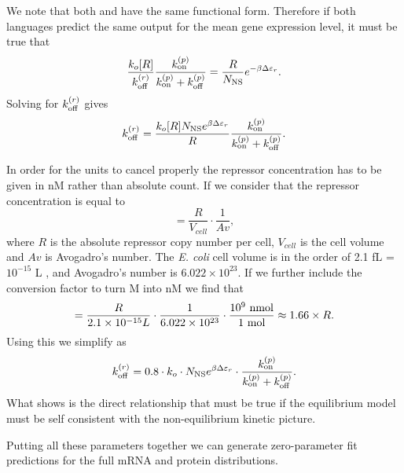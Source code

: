 We note that both  and  have the same
functional form. Therefore if both languages predict the same output for the
mean gene expression level, it must be true that
\begin{equation}
  {k_o [R] \over k^{(r)}_{\text{off}}}{k^{(p)}_{\text{on}}\over k^{(p)}_{\text{on}}+ k^{(p)}_{\text{off}}} =
  {R \over N_\text{NS}} e^{-\beta\Delta\varepsilon_r}.
\end{equation}
Solving for $k^{(r)}_{\text{off}}$ gives
\begin{equation}
  k^{(r)}_{\text{off}} = {k_o [R] N_\text{NS} e^{\beta\Delta\varepsilon_r} \over R}{k^{(p)}_{\text{on}} \over k^{(p)}_{\text{on}} + k^{(p)}_{\text{off}}}.
  \label{eq_kroff_complete}
\end{equation}

In order for the units to cancel properly the repressor concentration has to be
given in nM rather than absolute count. If we consider that the repressor
concentration is equal to
\begin{equation}
[R] = \frac{R}{V_{cell}}\cdot \frac{1}{Av},
\end{equation}
where $R$ is the absolute repressor copy number per cell, $V_{cell}$ is the cell
volume and $Av$ is Avogadro's number. The \textit{E. coli} cell volume is in the
order of 2.1 fL = $10^{-15}$ L , and Avogadro's
number is $6.022 \times 10^{23}$. If we further include the conversion factor to
turn M into nM we find that
\begin{equation}
[R] = {R \over 2.1 \times 10^{-15} L} \cdot {1 \over 6.022 \times 10^{23}}
\cdot {10^9 \text{ nmol} \over 1 \text{ mol}} \approx 1.66 \times R.
\end{equation}
Using this we simplify  as
\begin{equation}
  k^{(r)}_{\text{off}} = 0.8 \cdot k_o \cdot N_\text{NS} e^{\beta\Delta\varepsilon_r}
   \cdot {k^{(p)}_{\text{on}}\over k^{(p)}_{\text{on}}+ k^{(p)}_{\text{off}}}.
  \label{eq_kroff}
\end{equation}
What  shows is the direct relationship that must be true if the
equilibrium model must be self consistent with the non-equilibrium kinetic
picture.

Putting all these parameters together we can generate zero-parameter fit
predictions for the full mRNA and protein distributions.
